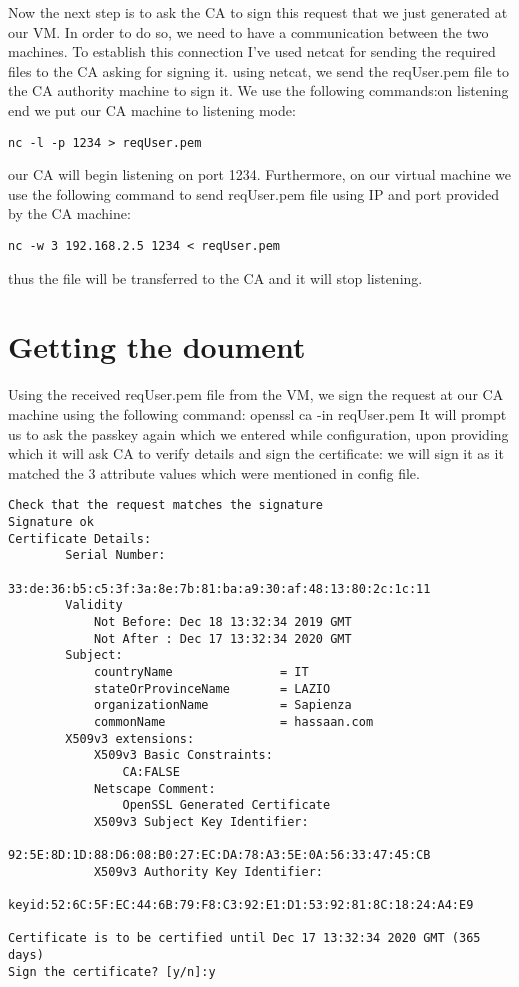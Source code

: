 \documentclass[11pt]{article}
\begin{document}
Now the next step is to ask the CA to sign this request that we just generated at our VM. In order to do so, we need to have a communication between the two machines. To establish this connection I've used netcat for sending the required files to the CA asking for signing it. using netcat, we send the reqUser.pem file to the CA authority machine to sign it. We use the following commands:\newline \newline on listening end we put our CA machine to listening mode:
\begin{verbatim}
nc -l -p 1234 > reqUser.pem
\end{verbatim}
our CA will begin listening on port 1234. Furthermore, on our virtual machine we use the following command to send reqUser.pem file using IP and port provided by the CA machine:
\begin{verbatim}
nc -w 3 192.168.2.5 1234 < reqUser.pem
\end{verbatim}
thus the file will be transferred to the CA and it will stop listening.

\section{Getting the doument}
Using the received reqUser.pem file from the VM, we sign the request at our CA machine using the following command: \newline \newline openssl ca -in reqUser.pem \newline \newline It will prompt us to ask the passkey again which we entered while configuration, upon providing which it will ask CA to verify details and sign the certificate: we will sign it as it matched the 3 attribute values which were mentioned in config file.

\begin{verbatim}
Check that the request matches the signature
Signature ok
Certificate Details:
        Serial Number:
            33:de:36:b5:c5:3f:3a:8e:7b:81:ba:a9:30:af:48:13:80:2c:1c:11
        Validity
            Not Before: Dec 18 13:32:34 2019 GMT
            Not After : Dec 17 13:32:34 2020 GMT
        Subject:
            countryName               = IT
            stateOrProvinceName       = LAZIO
            organizationName          = Sapienza
            commonName                = hassaan.com
        X509v3 extensions:
            X509v3 Basic Constraints:
                CA:FALSE
            Netscape Comment:
                OpenSSL Generated Certificate
            X509v3 Subject Key Identifier:
                92:5E:8D:1D:88:D6:08:B0:27:EC:DA:78:A3:5E:0A:56:33:47:45:CB
            X509v3 Authority Key Identifier:
                keyid:52:6C:5F:EC:44:6B:79:F8:C3:92:E1:D1:53:92:81:8C:18:24:A4:E9

Certificate is to be certified until Dec 17 13:32:34 2020 GMT (365 days)
Sign the certificate? [y/n]:y

\end{verbatim}
\end{document}
